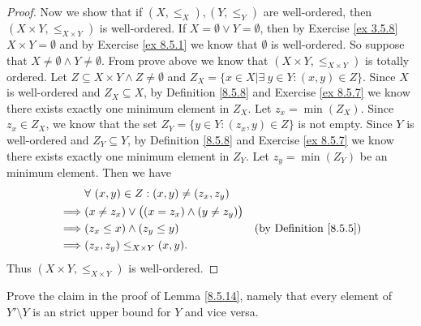 \begin{proof}
    Now we show that if \((X, \leq_X), (Y, \leq_Y)\) are well-ordered, then \((X \times Y, \leq_{X \times Y})\) is well-ordered.
    If \(X = \emptyset \lor Y = \emptyset\), then by Exercise \ref{ex 3.5.8} \(X \times Y = \emptyset\) and by Exercise \ref{ex 8.5.1} we know that \(\emptyset\) is well-ordered.
    So suppose that \(X \neq \emptyset \land Y \neq \emptyset\).
    From prove above we know that \((X \times Y, \leq_{X \times Y})\) is totally ordered.
    Let \(Z \subseteq X \times Y \land Z \neq \emptyset\) and \(Z_X = \{x \in X | \exists\ y \in Y : (x, y) \in Z\}\).
    Since \(X\) is well-ordered and \(Z_X \subseteq X\), by Definition \ref{8.5.8} and Exercise \ref{ex 8.5.7} we know there exists exactly one minimum element in \(Z_X\).
    Let \(z_x = \min(Z_X)\).
    Since \(z_x \in Z_X\), we know that the set \(Z_Y = \{y \in Y : (z_x, y) \in Z\}\) is not empty.
    Since \(Y\) is well-ordered and \(Z_Y \subseteq Y\), by Definition \ref{8.5.8} and Exercise \ref{ex 8.5.7} we know there exists exactly one minimum element in \(Z_Y\).
    Let \(z_y = \min(Z_Y)\) be an minimum element.
    Then we have
    \begin{align*}
                 & \forall\ (x, y) \in Z : (x, y) \neq (z_x, z_y)                                                \\
        \implies & (x \neq z_x) \lor \big((x = z_x) \land (y \neq z_y)\big)                                      \\
        \implies & (z_x \leq x) \land (z_y \leq y)                          & \text{(by Definition \ref{8.5.5})} \\
        \implies & (z_x, z_y) \leq_{X \times Y} (x, y).
    \end{align*}
    Thus \((X \times Y, \leq_{X \times Y})\) is well-ordered.
\end{proof}

\begin{exercise}\label{ex 8.5.13}
    Prove the claim in the proof of Lemma \ref{8.5.14}, namely that every element of \(Y' \setminus Y\) is an strict upper bound for \(Y\) and vice versa.
\end{exercise}

